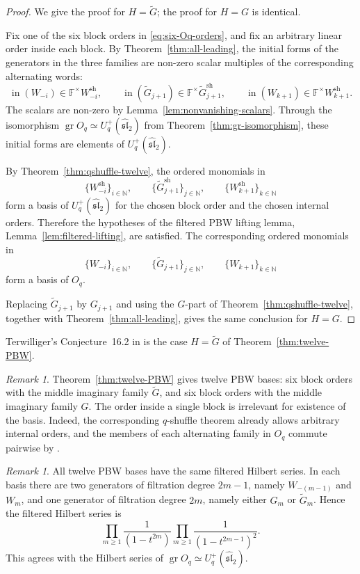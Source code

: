 \documentclass[11pt]{extarticle}
\theoremstyle{definition}
\theoremstyle{remark}
\newtheorem{remark}[theorem]{Remark}
\numberwithin{equation}{section}
\newcommand{\F}{\mathbb F}
\newcommand{\N}{\mathbb N}
\newcommand{\Oq}{O_q}
\newcommand{\Uplus}{U_q^+(\widehat{\mathfrak{sl}}_2)}
\newcommand{\gr}{\operatorname{gr}}
\newcommand{\init}{\operatorname{in}}
\newcommand{\sh}{\mathrm{sh}}
\begin{document}
\begin{proof}
We give the proof for \(H=\widetilde G\); the proof for \(H=G\) is
identical.

Fix one of the six block orders in \eqref{eq:six-Oq-orders}, and fix an
arbitrary linear order inside each block.  By
Theorem~\ref{thm:all-leading}, the initial forms of the generators in the
three families are non-zero scalar multiples of the corresponding
alternating words:
\[
 \init(W_{-i})\in\F^\times W_{-i}^{\sh},\qquad
 \init(\widetilde G_{j+1})\in\F^\times\widetilde G_{j+1}^{\sh},\qquad
 \init(W_{k+1})\in\F^\times W_{k+1}^{\sh}.
\]
The scalars are non-zero by Lemma~\ref{lem:nonvanishing-scalars}.  Through
the isomorphism \(\gr\Oq\simeq\Uplus\) from
Theorem~\ref{thm:gr-isomorphism}, these initial forms are elements of
\(\Uplus\).

By Theorem~\ref{thm:qshuffle-twelve}, the ordered monomials in
\[
 \{W_{-i}^{\sh}\}_{i\in\N},\qquad
 \{\widetilde G_{j+1}^{\sh}\}_{j\in\N},\qquad
 \{W_{k+1}^{\sh}\}_{k\in\N}
\]
form a basis of \(\Uplus\) for the chosen block order and the chosen
internal orders.  Therefore the hypotheses of the filtered PBW lifting
lemma, Lemma~\ref{lem:filtered-lifting}, are satisfied.  The corresponding
ordered monomials in
\[
 \{W_{-i}\}_{i\in\N},\qquad
 \{\widetilde G_{j+1}\}_{j\in\N},\qquad
 \{W_{k+1}\}_{k\in\N}
\]
form a basis of \(\Oq\).

Replacing \(\widetilde G_{j+1}\) by \(G_{j+1}\) and using the \(G\)-part of
Theorem~\ref{thm:qshuffle-twelve}, together with
Theorem~\ref{thm:all-leading}, gives the same conclusion for \(H=G\).
\end{proof}

Terwilliger's Conjecture~16.2 in
\cite{Terwilliger2022OqACE}  is the case \(H=\widetilde G\) of
Theorem~\ref{thm:twelve-PBW}.

\begin{remark}
Theorem~\ref{thm:twelve-PBW} gives twelve PBW bases: six block orders with
the middle imaginary family \(\widetilde G\), and six block orders with the
middle imaginary family \(G\).  The order inside a single block is
irrelevant for existence of the basis.  Indeed, the corresponding
\(q\)-shuffle theorem already allows arbitrary internal orders, and the
members of each alternating family in \(\Oq\) commute pairwise by
\cite[Theorem~11.6]{Terwilliger2022OqACE}.
\end{remark}

\begin{remark}
All twelve PBW bases have the same filtered Hilbert series.  In each basis
there are two generators of filtration degree \(2m-1\), namely
\(W_{-(m-1)}\) and \(W_m\), and one generator of filtration degree \(2m\),
namely either \(G_m\) or \(\widetilde G_m\).  Hence the filtered Hilbert
series is
\[
        \prod_{m\geq1}\frac{1}{(1-t^{2m})}
        \prod_{m\geq1}\frac{1}{(1-t^{2m-1})^2}.
\]
This agrees with the Hilbert series of \(\gr\Oq\simeq\Uplus\).
\end{remark}
\end{document}
